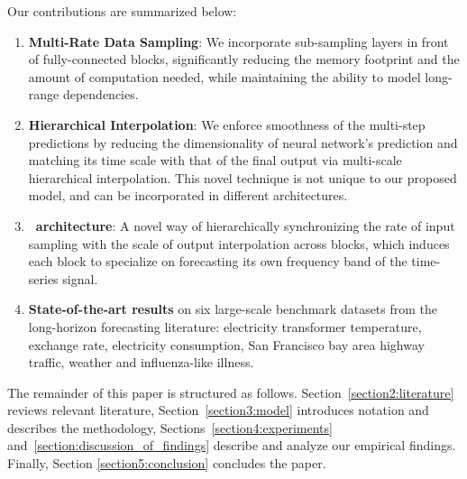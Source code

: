 Our contributions are summarized below:
\begin{enumerate}%
    \item \textbf{Multi-Rate Data Sampling}: We incorporate sub-sampling layers in front of fully-connected blocks, significantly reducing the memory footprint and the amount of computation needed, while maintaining the ability to model long-range dependencies. 
    \item \textbf{Hierarchical Interpolation}: We enforce smoothness of the multi-step predictions by reducing the dimensionality of neural network's prediction and matching its time scale with that of the final output via multi-scale hierarchical interpolation. This novel technique is not unique to our proposed model, and can be incorporated in different architectures.
    \item \textbf{\ourstext \ architecture}: A novel way of hierarchically synchronizing the rate of input sampling with the scale of output interpolation across blocks, which induces each block to specialize on forecasting its own frequency band of the time-series signal.
    \item \textbf{State-of-the-art results} on six large-scale benchmark datasets from the long-horizon forecasting literature: electricity transformer temperature, exchange rate, electricity consumption, San Francisco bay area highway traffic, weather and influenza-like illness. %
\end{enumerate}


The remainder of this paper is structured as follows. Section~\ref{section2:literature} reviews relevant literature, Section~\ref{section3:model} introduces notation and describes the methodology, Sections~\ref{section4:experiments} and~\ref{section:discussion_of_findings} describe and analyze our empirical findings. Finally, Section \ref{section5:conclusion} concludes the paper.
